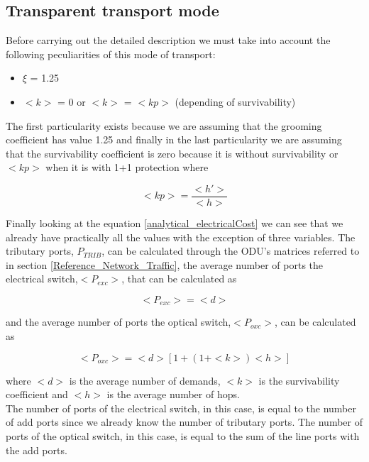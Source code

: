 \clearpage

\subsection{Transparent transport mode}\label{analytical_Transp_Mode}

Before carrying out the detailed description we must take into account the following peculiarities of this mode of transport:
\begin{itemize}
  \item $\xi$ = 1.25
  \item $<k>$ = 0 or $<k>$ = $<kp>$ (depending of survivability)
\end{itemize}

The first particularity exists because we are assuming that the grooming coefficient has value 1.25 and finally in the last particularity we are assuming that the survivability coefficient is zero because it is without survivability or $<kp>$ when it is with 1+1 protection where

\begin{equation}
<kp> = \frac{<h'>}{<h>}
\label{coefficient_protec2}
\end{equation}

\vspace{13pt}
Finally looking at the equation \ref{analytical_electricalCost} we can see that we already have practically all the values with the exception of three variables. The tributary ports, $P_{TRIB}$, can be calculated through the ODU's matrices referred to in section \ref{Reference_Network_Traffic}, the average number of ports the electrical switch,$<P_{exc}>$, that can be calculated as

\begin{equation}
<P_{exc}> = <d>
\label{Pexc_transp}
\end{equation}

\noindent
and the average number of ports the optical switch,$<P_{oxc}>$, can be calculated as

\begin{equation}
<P_{oxc}> = <d> [1 + \left(1 + <k>\right) <h>]
\label{Poxc_transp}
\end{equation}

\noindent
where $<d>$ is the average number of demands, $<k>$	is the survivability coefficient and $<h>$ is the average number of hops.\\
The number of ports of the electrical switch, in this case, is equal to the number of add ports since we already know the number of tributary ports. The number of ports of the optical switch, in this case, is equal to the sum of the line ports with the add ports.\\
